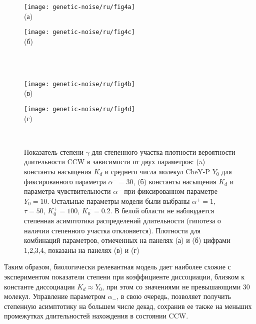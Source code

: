 \begin{figure}[ht]
    \begin{minipage}[b][][b]{0.45\linewidth}\centering
        \texttt{[image: genetic-noise/ru/fig4a]} \\ (а)
    \end{minipage}
    \hfill
    \begin{minipage}[b][][b]{0.45\linewidth}\centering
        \texttt{[image: genetic-noise/ru/fig4c]} \\ (б)
    \end{minipage}\\ \\
    \begin{minipage}[b][][b]{0.45\linewidth}\centering
        \texttt{[image: genetic-noise/ru/fig4b]} \\ (в)
    \end{minipage}
    \hfill
    \begin{minipage}[b][][b]{0.45\linewidth}\centering
        \texttt{[image: genetic-noise/ru/fig4d]} \\ (г)
    \end{minipage} \\
    \caption{
        Показатель степени $\gamma$ для степенного участка плотности вероятности длительности CCW в зависимости от двух параметров: (a) константы насыщения $K_d$ и среднего числа молекул CheY-P $Y_0$ для фиксированного параметра $\alpha^- = 30$, (б) константы насыщения $K_d$ и параметра чувствительности $\alpha^-$ при фиксированном параметре $Y_0 = 10$. Остальные параметры модели были выбраны $\alpha^+=1$, $\tau=50$, $K^+_0=100$, $K^-_0=0.2$. В белой области не наблюдается степенная асимптотика распределений длительности (гипотеза о наличии степенного участка отклоняется). Плотности для комбинаций параметров, отмеченных на панелях (а) и (б) цифрами 1,2,3,4, показаны на панелях (в) и (г)
    }\label{fig:pdf-gamma-grid-kd}
\end{figure}

Таким образом, биологически релевантная модель дает наиболее схожие с экспериментом показатели степени при коэффициенте диссоциации, близком к константе диссоциации $K_d \approx Y_0$, при этом со значениями не превышающими $30$ молекул. Управление параметром $\alpha_-$, в свою очередь, позволяет получить степенную асимптотику на большем числе декад, сохранив ее также на меньших промежутках длительностей нахождения в состоянии CCW.

